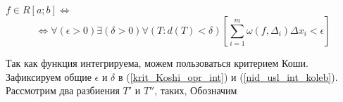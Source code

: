 \begin{teorema}
$f\in R[a;b] \Leftrightarrow$
\begin{equation}\label{nid_usl_int_koleb}
	\Leftrightarrow \forall(\epsilon>0)\exists(\delta>0)\forall(T:d(T)<\delta)
	\left[\sum_{i=1}^m\omega(f,\Delta_i) \Delta x_i <\epsilon\right]
\end{equation}
\end{teorema}

\dokvo
\neobh

Так как функция интегрируема, можем пользоваться критерием Коши.
Зафиксируем общие $\epsilon$ и $\delta$ в (\ref{krit_Koshi_opr_int}) и (\ref{nid_usl_int_koleb}).
Рассмотрим два разбиения $T'$ и $T''$, таких, 
Обозначим $ $



